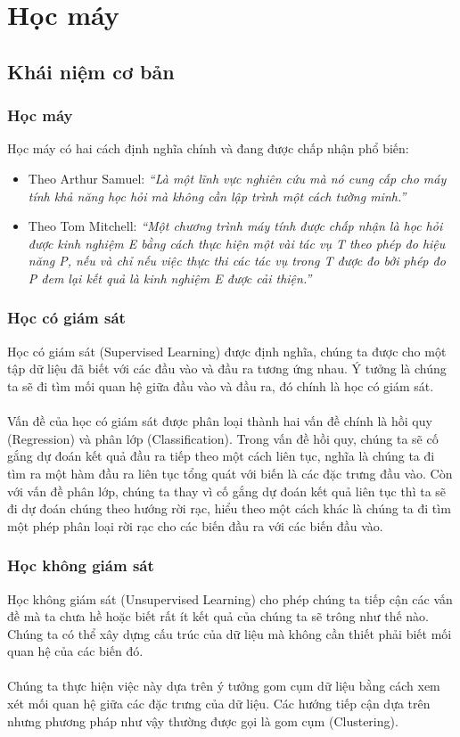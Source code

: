 \section{Học máy}
\subsection{Khái niệm cơ bản}
\subsubsection{Học máy}
Học máy có hai cách định nghĩa chính và đang được chấp nhận phổ biến:
\begin{itemize}
\item Theo Arthur Samuel: \textit{``Là một lĩnh vực nghiên cứu mà nó cung cấp 
cho máy tính khả năng học hỏi mà không cần lập trình một cách tường minh.''}
\item Theo Tom Mitchell: \textit{``Một chương trình máy tính được chấp nhận là 
học hỏi được kinh nghiệm E bằng cách thực hiện một vài tác vụ T theo phép đo hiệu
năng P, nếu và chỉ nếu việc thực thi các tác vụ trong T được đo bởi phép đo P
đem lại kết quả là kinh nghiệm E được cải thiện.''}
\end{itemize}
\subsubsection{Học có giám sát}
Học có giám sát (Supervised Learning) được định nghĩa, chúng ta được cho một 
tập dữ liệu đã biết với các đầu vào và đầu ra tương ứng nhau. Ý tưởng là chúng 
ta sẽ đi tìm mối quan hệ giữa đầu vào và đầu ra, đó chính là học có giám sát.\\\\
Vấn đề của học có giám sát được phân loại thành hai
vấn đề chính là hồi quy (Regression) và phân lớp (Classification). Trong vấn đề 
hồi quy, chúng ta sẽ cố gắng dự đoán kết quả đầu ra tiếp theo một cách liên tục, 
nghĩa là chúng ta đi tìm ra một hàm đầu ra liên tục tổng quát với biến là các 
đặc trưng đầu vào. Còn với vấn đề phân lớp, chúng ta thay vì cố gắng dự đoán kết
quả liên tục thì ta sẽ đi dự đoán chúng theo hướng rời rạc, hiểu theo một cách
khác là chúng ta đi tìm một phép phân loại rời rạc cho các biến đầu ra với các 
biến đầu vào.
\subsubsection{Học không giám sát}
Học không giám sát (Unsupervised Learning) cho phép chúng ta tiếp cận các vấn 
đề mà ta chưa hề hoặc biết rất ít kết quả của chúng ta sẽ trông như thế nào. 
Chúng ta có thể xây dựng cấu trúc của dữ liệu mà không cần thiết phải biết mối 
quan hệ của các biến đó.\\\\
Chúng ta thực hiện việc này dựa trên ý tưởng gom cụm dữ liệu bằng cách xem xét
mối quan hệ giữa các đặc trưng của dữ liệu. Các hướng tiếp cận dựa trên nhưng 
phương pháp như vậy thường được gọi là gom cụm (Clustering).
